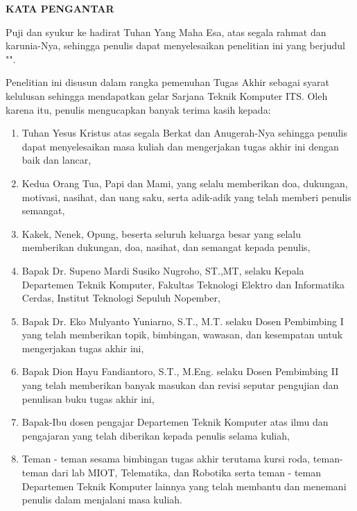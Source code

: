 \begin{center}
  \Large
  \textbf{KATA PENGANTAR}
\end{center}


\vspace{2ex}


Puji dan syukur ke hadirat Tuhan Yang Maha Esa, atas segala rahmat dan karunia-Nya,
sehingga penulis dapat menyelesaikan penelitian ini yang berjudul
"\tatitle".

Penelitian ini disusun dalam rangka pemenuhan Tugas Akhir sebagai syarat kelulusan sehingga mendapatkan gelar Sarjana Teknik Komputer ITS. Oleh karena itu, penulis mengucapkan banyak terima kasih kepada:

\begin{enumerate}[nolistsep]
  \item Tuhan Yesus Kristus atas segala Berkat dan Anugerah-Nya sehingga penulis dapat menyelesaikan masa kuliah dan mengerjakan tugas akhir ini dengan baik dan lancar,

  \item Kedua Orang Tua, Papi dan Mami, yang selalu memberikan doa, dukungan, motivasi, nasihat, dan uang saku, serta adik-adik yang telah memberi penulis semangat,
  
  \item Kakek, Nenek, Opung, beserta seluruh keluarga besar yang selalu memberikan dukungan, doa, nasihat, dan semangat kepada penulis,

  \item Bapak Dr. Supeno Mardi Susiko Nugroho, ST.,MT, selaku Kepala Departemen Teknik Komputer, Fakultas Teknologi Elektro dan Informatika Cerdas, Institut Teknologi Sepuluh Nopember,

  \item Bapak Dr. Eko Mulyanto Yuniarno, S.T., M.T. selaku Dosen Pembimbing I yang telah memberikan topik, bimbingan, wawasan, dan kesempatan untuk mengerjakan tugas akhir ini,

  \item Bapak Dion Hayu Fandiantoro, S.T., M.Eng. selaku Dosen Pembimbing II yang telah memberikan banyak masukan dan revisi seputar pengujian dan penulisan buku tugas akhir ini,

  \item Bapak-Ibu dosen pengajar Departemen Teknik Komputer atas ilmu dan pengajaran yang telah diberikan kepada penulis selama kuliah,
  
  \item Teman - teman sesama bimbingan tugas akhir terutama kursi roda, teman-teman dari lab MIOT, Telematika, dan Robotika serta teman - teman Departemen Teknik Komputer lainnya yang telah membantu dan menemani penulis dalam menjalani masa kuliah.

\end{enumerate}

